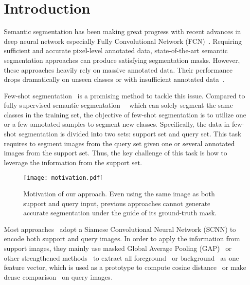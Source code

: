 \documentclass[final]{cvpr}
\begin{document}
\section{Introduction}
Semantic segmentation has been making great progress with recent advances in deep neural network especially Fully Convolutional Network (FCN)~\cite{long2015fully}. Requiring sufficient and accurate pixel-level annotated data, state-of-the-art semantic segmentation approaches can produce satisfying segmentation masks. However, these approaches heavily rely on massive annotated data.
Their performance drops dramatically on unseen classes or with insufficient annotated data~\cite{zhang2020reliability}.

Few-shot segmentation~\cite{gairola2020simpropnet, li2020fss, rakelly2018conditional, siam2019amp} is a promising method to tackle this issue. Compared to fully supervised semantic segmentation~~\cite{chen2018deeplab, chen2018encoder, Huang_2019_ICCV, li2020improving} which can solely segment the same classes in the training set, the objective of few-shot segmentation is to utilize one or a few annotated samples to segment new classes. Specifically, the data in few-shot segmentation is divided into two sets: support set and query set. This task requires to segment images from the query set given one or several annotated images from the support set. Thus, the key challenge of this task is how to leverage the information from the support set.
\begin{figure}
	\centering
	\texttt{[image: motivation.pdf]}
	\caption{Motivation of our approach. Even using the same image as both support and query input, previous approaches cannot generate accurate segmentation under the guide of its ground-truth mask.}
	\label{fig:motivation}
\end{figure}
Most approaches~\cite{dong2018few, liu2020part, wang2019panet, zhang2019canet, yang2020new, tian2020differentiable} adopt a Siamese Convolutional Neural Network (SCNN) to encode both support and query images. In order to apply the information from support images, they mainly use masked Global Average Pooling (GAP)~\cite{zhou2016learning} or other strengthened methods~\cite{nguyen2019feature} to extract all foreground~\cite{wang2019panet, zhang2019canet, liu2020crnet} or background~\cite{wang2019panet} as one feature vector, which is used as a prototype to compute cosine distance~\cite{zhang2020sg} or make dense comparison~\cite{zhang2019canet} on query images. 
\end{document}

